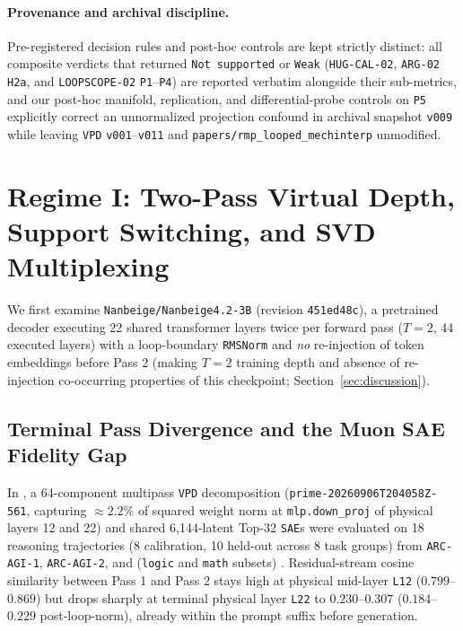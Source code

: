 \documentclass[10pt,letterpaper]{article}
\begin{document}
\paragraph{Provenance and archival discipline.} Pre-registered decision rules and post-hoc controls are kept strictly distinct: all composite verdicts that returned \texttt{Not supported} or \texttt{Weak} (\texttt{HUG-CAL-02}, \texttt{ARG-02} \texttt{H2a}, and \texttt{LOOPSCOPE-02} \texttt{P1}--\texttt{P4}) are reported verbatim alongside their sub-metrics, and our post-hoc manifold, replication, and differential-probe controls on \texttt{P5} explicitly correct an unnormalized projection confound in archival snapshot \texttt{v009} while leaving \texttt{VPD} \texttt{v001}--\texttt{v011} and \texttt{papers/rmp\_looped\_mechinterp} unmodified.

\section{Regime I: Two-Pass Virtual Depth, Support Switching, and SVD Multiplexing}\label{sec:regime1}

We first examine \texttt{Nanbeige/Nanbeige4.2-3B} \cite{nanbeige2026model} (revision \texttt{451ed48c}), a pretrained decoder executing 22 shared transformer layers twice per forward pass ($T=2$, 44 executed layers) with a loop-boundary \texttt{RMSNorm} and \emph{no} re-injection of token embeddings before Pass 2 (making $T=2$ training depth and absence of re-injection co-occurring properties of this checkpoint; Section~\ref{sec:discussion}).

\subsection{Terminal Pass Divergence and the Muon SAE Fidelity Gap}

In \cite{dugan2026vpd}, a 64-component multipass \texttt{VPD} decomposition (\texttt{prime-20260906T204058Z-561}, capturing $\approx 2.2\%$ of squared weight norm at \texttt{mlp.down\_proj} of physical layers 12 and 22) and shared 6,144-latent Top-32 \texttt{SAE}s were evaluated on 18 reasoning trajectories (8 calibration, 10 held-out across 8 task groups) from \texttt{ARC-AGI-1}, \texttt{ARC-AGI-2}, and  (\texttt{logic} and \texttt{math} subsets) \cite{primeintellect2025intellect3}. Residual-stream cosine similarity between Pass 1 and Pass 2 stays high at physical mid-layer \texttt{L12} ($0.799$--$0.869$) but drops sharply at terminal physical layer \texttt{L22} to $0.230$--$0.307$ ($0.184$--$0.229$ post-loop-norm), already within the prompt suffix before generation.
\end{document}
